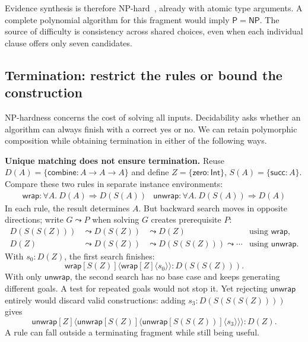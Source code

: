\documentclass[10pt,a4paper]{article}
\newcommand{\Int}{\mathsf{Int}}
\newcommand{\iarg}[1]{\langle#1\rangle}
\newcommand{\kw}[1]{\mathsf{#1}}
\begin{document}
Evidence synthesis is therefore NP-hard~\cite{karp1972}, already with atomic type
arguments. A complete polynomial algorithm for this fragment would imply
$\mathsf P=\mathsf{NP}$. The source of difficulty is consistency across shared
choices, even when each individual clause offers only seven candidates.

\newpage
\subsection{Termination: restrict the rules or bound the construction}
\label{sec:decidable-resolution}
NP-hardness concerns the cost of solving all inputs. Decidability asks whether an
algorithm can always finish with a correct yes or no. We can retain polymorphic
composition while obtaining termination in either of the following ways.

\textbf{Unique matching does not ensure termination.}
Reuse $D(A)=\{\kw{combine}:A\to A\to A\}$ and define
$Z=\{\kw{zero}:\Int\}$, $S(A)=\{\kw{succ}:A\}$.
Compare these two rules in separate instance environments:
\[
\begin{array}{c|c}
 \kw{wrap}:\forall A.\ D(A)\Rightarrow D(S(A))
   & \kw{unwrap}:\forall A.\ D(S(A))\Rightarrow D(A)
\end{array}
\]
In each rule, the result determines $A$. But backward search moves in opposite
directions; write $G\leadsto P$ when solving $G$ creates prerequisite $P$:
\[
\begin{array}{rcll}
 D(S(S(Z)))&\leadsto D(S(Z))&\leadsto D(Z)
   &\text{using }\kw{wrap},\\[2pt]
 D(Z)&\leadsto D(S(Z))&\leadsto D(S(S(Z)))\leadsto\cdots
   &\text{using }\kw{unwrap}.
\end{array}
\]
With $s_0:D(Z)$, the first search finishes:
\[
 \kw{wrap}[S(Z)]\iarg{\kw{wrap}[Z]\iarg{s_0}}:D(S(S(Z))).
\]
With only $\kw{unwrap}$, the second search has no base case and keeps generating
different goals. A test for repeated goals would not stop it.
Yet rejecting $\kw{unwrap}$ entirely would discard valid constructions: adding
$s_3:D(S(S(S(Z))))$ gives
\[
 \kw{unwrap}[Z]\iarg{
   \kw{unwrap}[S(Z)]\iarg{
     \kw{unwrap}[S(S(Z))]\iarg{s_3}}}:D(Z).
\]
A rule can fall outside a terminating fragment while still being useful.
\end{document}

